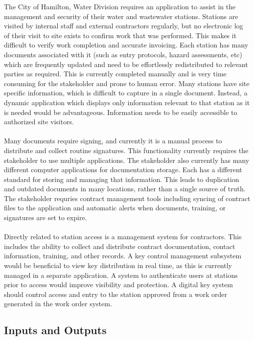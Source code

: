 \documentclass{article}
\begin{document}
The City of Hamilton, Water Division requires an application to assist in the management and security of their
water and wastewater stations. Stations are visited by internal staff and external contractors regularly, but no
electronic log of their visit to site exists to confirm work that was performed. This makes it difficult to verify
work completion and accurate invoicing. Each station has many documents associated with it (such as entry
protocols, hazard assessments, etc) which are frequently updated and need to be effortlessly redistributed to
relevant parties as required. This is currently completed manually and is very time consuming for the
stakeholder and prone to human error. Many stations have site specific information, which is difficult to
capture in a single document. Instead, a dynamic application which displays only information relevant to that
station as it is needed would be advantageous. Information needs to be easily accessible to authorized site
visitors.\\
\\
Many documents require signing, and currently it is a manual process to distribute and collect routine
signatures. This functionality currently requires the stakeholder to use multiple applications. The stakeholder
also currently has many different computer applications for documentation storage. Each has a different
standard for storing and managing that information. This leads to duplication and outdated documents in
many locations, rather than a single source of truth. The stakeholder requries contract management tools
including syncing of contract files to the application and automatic alerts when documents, training, or
signatures are set to expire.\\
\\
Directly related to station access is a management system for contractors. This includes the ability to collect
and distribute contract documentation, contact information, training, and other records. A key control
management subsystem would be beneficial to view key distribution in real time, as this is currently managed
in a separate application. A system to authenticate users at stations prior to access would improve visibility
and protection. A digital key system should control access and entry to the station approved from a work
order generated in the work order system.\\

\subsection{Inputs and Outputs}
\end{document}
